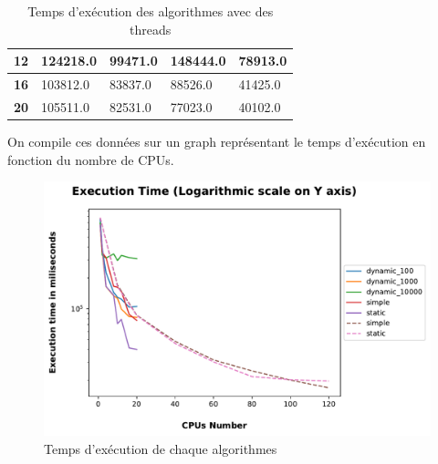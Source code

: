 \documentclass[12pt,a4paper,oneside, titlepage]{report}
\begin{document}
\begin{table}[H]
\begin{tabular}{c|l|l|l|l|}
				\multicolumn{1}{|c|}{\cellcolor[HTML]{EFEFEF}\textbf{12}} & 124218.0                                                           & 99471.0                                                             & 148444.0                                                     & 78913.0                                                      \\ \hline
				\multicolumn{1}{|c|}{\cellcolor[HTML]{EFEFEF}\textbf{16}} & 103812.0                                                           & 83837.0                                                             & 88526.0                                                      & 41425.0                                                      \\ \hline
				\multicolumn{1}{|c|}{\cellcolor[HTML]{EFEFEF}\textbf{20}} & 105511.0                                                           & 82531.0                                                             & 77023.0                                                      & 40102.0                                                      \\ \hline
			\end{tabular}
			\caption{Temps d'exécution des algorithmes avec des threads}
		\end{table}

		\newpage

		On compile ces données sur un graph représentant le temps d'exécution en fonction du nombre de CPUs.

		\begin{figure}[H]
			\centering
			\includegraphics[scale=0.85]{graphs/execTime}
			\caption {Temps d'exécution de chaque algorithmes}
		\end{figure}
\end{document}
